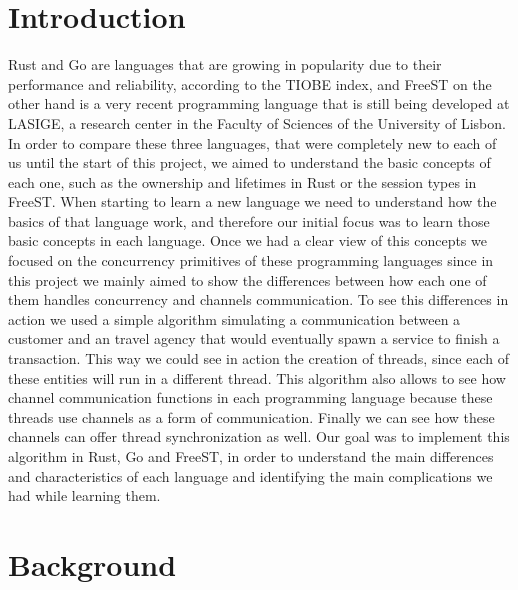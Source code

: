 \documentclass[runningheads]{llncs}
\begin{document}
\section{Introduction}
Rust and Go are languages that are growing in popularity due to their performance and reliability, according to the TIOBE index, and FreeST\cite{freest} on the other hand is a very recent programming language that is still being developed at LASIGE, a research center in the Faculty of Sciences of the University of Lisbon. 
In order to compare these three languages, that were completely new to each of us until the start of this project, we aimed to understand the basic concepts of each one, such as the ownership and lifetimes in Rust or the session types \cite{session} in FreeST.
When starting to learn a new language we need to understand how the basics of that language work, and therefore our initial focus was to learn those basic concepts in each language. Once we had a clear view of this concepts we focused on the concurrency primitives of these programming languages since in this project we mainly aimed to show the differences between how each one of them handles concurrency and channels communication.
To see this differences in action we used a simple algorithm simulating a communication between a customer and an travel agency that would eventually spawn a service to finish a transaction. This way we could see in action the creation of threads, since each of these entities will run in a different thread. This algorithm also allows to see how channel communication functions in each programming language because these threads use channels as a form of communication. Finally we can see how these channels can offer thread synchronization as well.
Our goal was to implement this algorithm in Rust, Go and FreeST, in order to understand the main differences and characteristics of each language and identifying the main complications we had while learning them.
\section{Background}
\end{document}
